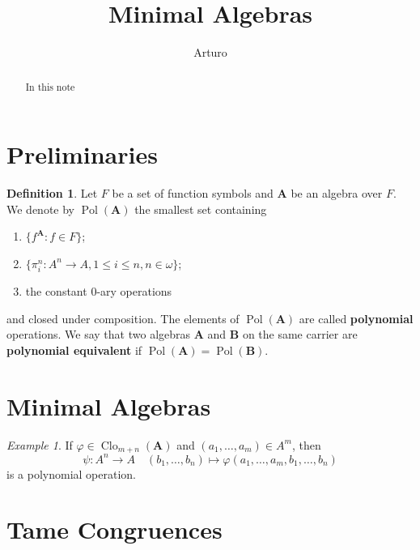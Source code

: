 \documentclass{amsart}
\theoremstyle{plain}
\theoremstyle{definition}
\newtheorem{definition}[theorem]{Definition}
\theoremstyle{remark}
\newtheorem{example}[theorem]{Example}
\def\phi{\varphi}
\DeclareMathOperator{\Clo}{Clo}
\DeclareMathOperator{\Pol}{Pol}
\begin{document}
\title{Minimal Algebras}
\author{Arturo}


\begin{abstract}
   In this note 
\end{abstract}

\maketitle 

\section{Preliminaries} 
\begin{definition}
    Let $F$ be a set of function symbols and $\mathbf{A}$ be an algebra over $F$. 
    We denote by $\Pol(\mathbf{A})$ the smallest set containing 
    \begin{enumerate}
        \item $\{f^\mathbf{A}: f \in F\}$; 
        \item $\{\pi^n_i: A^n \to A, 1 \le i \le n, n \in \omega\}$; 
        \item the constant $0$-ary operations
    \end{enumerate}
and closed under composition. 
The elements of $\Pol(\mathbf{A})$ are called \textbf{polynomial} operations. 
We say that two algebras $\mathbf{A}$ and $\mathbf{B}$ on the same carrier are \textbf{polynomial equivalent} if $\Pol(\mathbf{A})=\Pol(\mathbf{B})$. 
\end{definition}

\section{Minimal Algebras}


\begin{example}
    If $\phi \in \Clo_{m+n}(\mathbf{A})$ and $(a_1, \ldots, a_m) \in A^m$, then 
    \begin{equation*}
        \psi: A^n \to A \quad (b_1, \ldots, b_n) \mapsto \phi(a_1, \ldots, a_m,b_1, \ldots, b_n)
    \end{equation*}
is a polynomial operation.  
\end{example}


\section{Tame Congruences}
\end{document}
